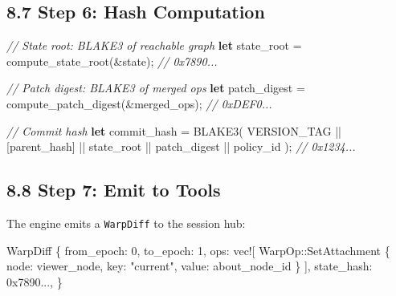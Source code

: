 \documentclass[
  11pt,
]{book}
\newenvironment{Shaded}{}{}
\newcommand{\CommentTok}[1]{\textcolor[rgb]{0.38,0.63,0.69}{\textit{#1}}}
\newcommand{\DecValTok}[1]{\textcolor[rgb]{0.25,0.63,0.44}{#1}}
\newcommand{\KeywordTok}[1]{\textcolor[rgb]{0.00,0.44,0.13}{\textbf{#1}}}
\newcommand{\NormalTok}[1]{#1}
\newcommand{\OperatorTok}[1]{\textcolor[rgb]{0.40,0.40,0.40}{#1}}
\newcommand{\PreprocessorTok}[1]{\textcolor[rgb]{0.74,0.48,0.00}{#1}}
\newcommand{\StringTok}[1]{\textcolor[rgb]{0.25,0.44,0.63}{#1}}
\begin{document}
\subsection{8.7 Step 6: Hash Computation}\label{step-6-hash-computation}

\begin{Shaded}
\begin{Highlighting}[]
\CommentTok{// State root: BLAKE3 of reachable graph}
\KeywordTok{let}\NormalTok{ state\_root }\OperatorTok{=}\NormalTok{ compute\_state\_root(}\OperatorTok{\&}\NormalTok{state)}\OperatorTok{;}  \CommentTok{// 0x7890...}

\CommentTok{// Patch digest: BLAKE3 of merged ops}
\KeywordTok{let}\NormalTok{ patch\_digest }\OperatorTok{=}\NormalTok{ compute\_patch\_digest(}\OperatorTok{\&}\NormalTok{merged\_ops)}\OperatorTok{;}  \CommentTok{// 0xDEF0...}

\CommentTok{// Commit hash}
\KeywordTok{let}\NormalTok{ commit\_hash }\OperatorTok{=}\NormalTok{ BLAKE3(}
\NormalTok{    VERSION\_TAG }\OperatorTok{||}
\NormalTok{    [parent\_hash] }\OperatorTok{||}
\NormalTok{    state\_root }\OperatorTok{||}
\NormalTok{    patch\_digest }\OperatorTok{||}
\NormalTok{    policy\_id}
\NormalTok{)}\OperatorTok{;}  \CommentTok{// 0x1234...}
\end{Highlighting}
\end{Shaded}

\subsection{8.8 Step 7: Emit to Tools}\label{step-7-emit-to-tools}

The engine emits a \texttt{WarpDiff} to the session hub:

\begin{Shaded}
\begin{Highlighting}[]
\NormalTok{WarpDiff }\OperatorTok{\{}
\NormalTok{    from\_epoch}\OperatorTok{:} \DecValTok{0}\OperatorTok{,}
\NormalTok{    to\_epoch}\OperatorTok{:} \DecValTok{1}\OperatorTok{,}
\NormalTok{    ops}\OperatorTok{:} \PreprocessorTok{vec!}\NormalTok{[}
        \PreprocessorTok{WarpOp::}\NormalTok{SetAttachment }\OperatorTok{\{}
\NormalTok{            node}\OperatorTok{:}\NormalTok{ viewer\_node}\OperatorTok{,}
\NormalTok{            key}\OperatorTok{:} \StringTok{"current"}\OperatorTok{,}
\NormalTok{            value}\OperatorTok{:}\NormalTok{ about\_node\_id}
        \OperatorTok{\}}
\NormalTok{    ]}\OperatorTok{,}
\NormalTok{    state\_hash}\OperatorTok{:} \DecValTok{0x7890}\OperatorTok{...,}
\OperatorTok{\}}
\end{Highlighting}
\end{Shaded}
\end{document}

